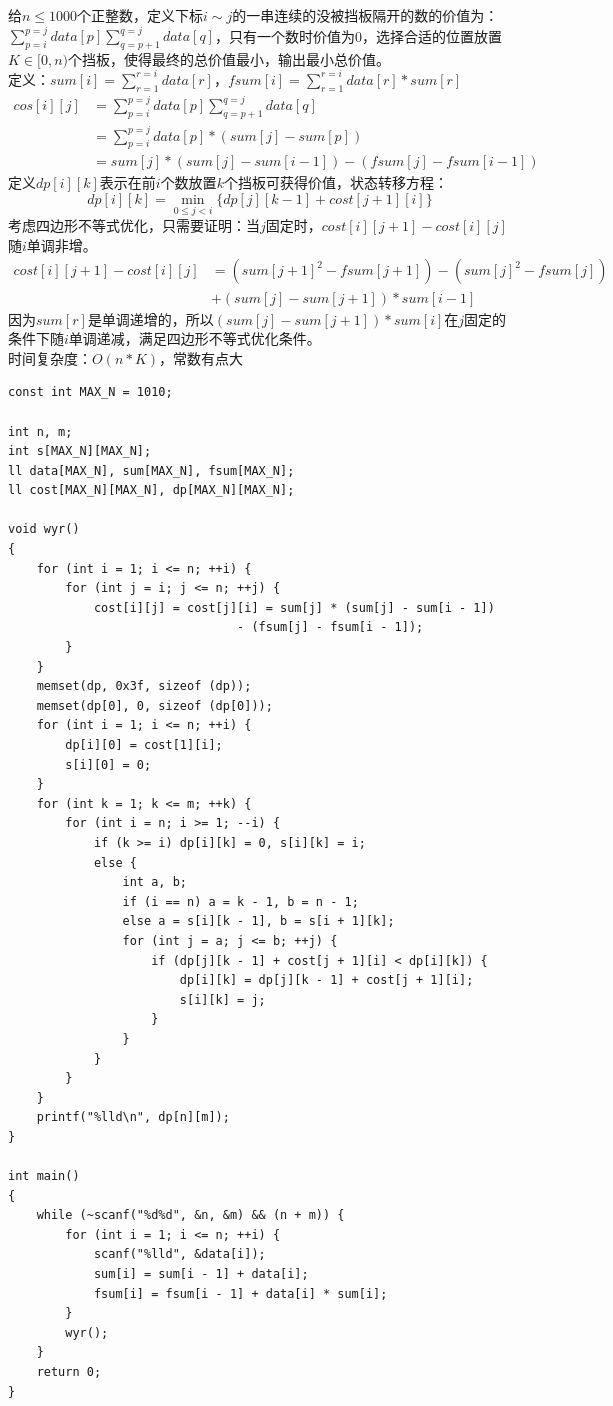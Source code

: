 给$n\leq 1000$个正整数，定义下标$i\sim j$的一串连续的没被挡板隔开的数的价值为：$\sum_{p=i}^{p=j}data[p]\sum_{q=p+1}^{q=j}{data[q]}$，只有一个数时价值为0，选择合适的位置放置$K\in [0,n)$个挡板，使得最终的总价值最小，输出最小总价值。 \\

定义：$sum[i]=\sum_{r=1}^{r=i}{data[r]}$，$fsum[i]=\sum_{r=1}^{r=i}data[r]*sum[r]$
$$
\begin{aligned}
cos[i][j]&=\sum_{p=i}^{p=j}data[p]\sum_{q=p+1}^{q=j}{data[q]} \\
&=\sum_{p=i}^{p=j}data[p]*(sum[j]-sum[p]) \\
&=sum[j]*(sum[j]-sum[i-1])-(fsum[j]-fsum[i-1])
\end{aligned}
$$
定义$dp[i][k]$表示在前$i$个数放置$k$个挡板可获得价值，状态转移方程：
$$
dp[i][k]=\min_{0\leq j < i}\{dp[j][k-1]+cost[j+1][i]\}
$$
考虑四边形不等式优化，只需要证明：当$j$固定时，$cost[i][j+1]-cost[i][j]$随$i$单调非增。
$$
\begin{aligned}
cost[i][j+1]-cost[i][j]&=({sum[j+1]}^{2}-fsum[j+1])-({sum[j]}^{2}-fsum[j]) \\
&+(sum[j]-sum[j+1])*sum[i-1]
\end{aligned}
$$
因为$sum[r]$是单调递增的，所以$(sum[j]-sum[j+1])*sum[i]$在$j$固定的条件下随$i$单调递减，满足四边形不等式优化条件。 \\
时间复杂度：$O(n*K)$，常数有点大
\begin{lstlisting}
const int MAX_N = 1010;

int n, m;
int s[MAX_N][MAX_N];
ll data[MAX_N], sum[MAX_N], fsum[MAX_N];
ll cost[MAX_N][MAX_N], dp[MAX_N][MAX_N];

void wyr()
{
	for (int i = 1; i <= n; ++i) {
		for (int j = i; j <= n; ++j) {
			cost[i][j] = cost[j][i] = sum[j] * (sum[j] - sum[i - 1])
                                - (fsum[j] - fsum[i - 1]);
		}
	}
	memset(dp, 0x3f, sizeof (dp));
	memset(dp[0], 0, sizeof (dp[0]));
	for (int i = 1; i <= n; ++i) {
		dp[i][0] = cost[1][i];
		s[i][0] = 0;
	}
	for (int k = 1; k <= m; ++k) {
		for (int i = n; i >= 1; --i) {
			if (k >= i) dp[i][k] = 0, s[i][k] = i;
			else {
				int a, b;
				if (i == n) a = k - 1, b = n - 1;
				else a = s[i][k - 1], b = s[i + 1][k];
				for (int j = a; j <= b; ++j) {
					if (dp[j][k - 1] + cost[j + 1][i] < dp[i][k]) {
						dp[i][k] = dp[j][k - 1] + cost[j + 1][i];
						s[i][k] = j;
					}
				}
			}
		}
	}
	printf("%lld\n", dp[n][m]);
}

int main()
{
	while (~scanf("%d%d", &n, &m) && (n + m)) {
		for (int i = 1; i <= n; ++i) {
			scanf("%lld", &data[i]);
			sum[i] = sum[i - 1] + data[i];
			fsum[i] = fsum[i - 1] + data[i] * sum[i];
		}
		wyr();
	}
	return 0;
}
\end{lstlisting}
